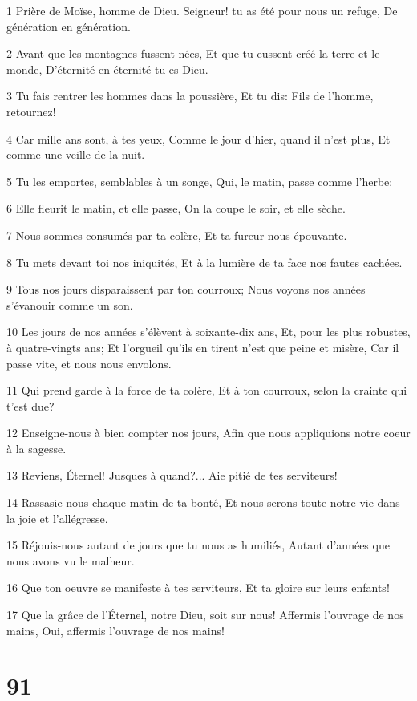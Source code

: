 \par 1 Prière de Moïse, homme de Dieu. Seigneur! tu as été pour nous un refuge, De génération en génération.
\par 2 Avant que les montagnes fussent nées, Et que tu eussent créé la terre et le monde, D'éternité en éternité tu es Dieu.
\par 3 Tu fais rentrer les hommes dans la poussière, Et tu dis: Fils de l'homme, retournez!
\par 4 Car mille ans sont, à tes yeux, Comme le jour d'hier, quand il n'est plus, Et comme une veille de la nuit.
\par 5 Tu les emportes, semblables à un songe, Qui, le matin, passe comme l'herbe:
\par 6 Elle fleurit le matin, et elle passe, On la coupe le soir, et elle sèche.
\par 7 Nous sommes consumés par ta colère, Et ta fureur nous épouvante.
\par 8 Tu mets devant toi nos iniquités, Et à la lumière de ta face nos fautes cachées.
\par 9 Tous nos jours disparaissent par ton courroux; Nous voyons nos années s'évanouir comme un son.
\par 10 Les jours de nos années s'élèvent à soixante-dix ans, Et, pour les plus robustes, à quatre-vingts ans; Et l'orgueil qu'ils en tirent n'est que peine et misère, Car il passe vite, et nous nous envolons.
\par 11 Qui prend garde à la force de ta colère, Et à ton courroux, selon la crainte qui t'est due?
\par 12 Enseigne-nous à bien compter nos jours, Afin que nous appliquions notre coeur à la sagesse.
\par 13 Reviens, Éternel! Jusques à quand?... Aie pitié de tes serviteurs!
\par 14 Rassasie-nous chaque matin de ta bonté, Et nous serons toute notre vie dans la joie et l'allégresse.
\par 15 Réjouis-nous autant de jours que tu nous as humiliés, Autant d'années que nous avons vu le malheur.
\par 16 Que ton oeuvre se manifeste à tes serviteurs, Et ta gloire sur leurs enfants!
\par 17 Que la grâce de l'Éternel, notre Dieu, soit sur nous! Affermis l'ouvrage de nos mains, Oui, affermis l'ouvrage de nos mains!

\chapter{91}

